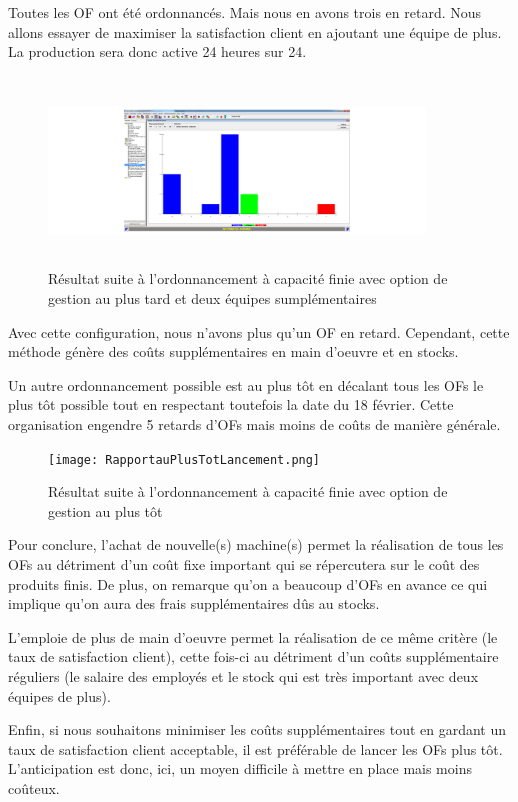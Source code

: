 \documentclass{scrreprt}
\begin{document}
Toutes les OF ont été ordonnancés. Mais nous en avons trois en retard. Nous allons essayer de maximiser la satisfaction client en ajoutant une équipe de plus. La production sera donc active 24 heures sur 24.

\begin{figure}[!h]
\centering
\includegraphics[width=10cm, height=5cm]{2equipeenplus.png}
\caption{Résultat suite à l'ordonnancement à capacité finie avec option de gestion au plus tard et deux équipes sumplémentaires}
\end{figure}

Avec cette configuration, nous n'avons plus qu'un OF en retard. Cependant, cette méthode génère des coûts supplémentaires en main d'oeuvre et en stocks.

Un autre ordonnancement possible est au plus tôt en décalant tous les OFs le plus tôt possible tout en respectant toutefois la date du 18 février. Cette organisation engendre 5 retards d'OFs mais moins de coûts de manière générale.

 \begin{figure}[!h]
\centering
\texttt{[image: RapportauPlusTotLancement.png]}
\caption{Résultat suite à l'ordonnancement à capacité finie avec option de gestion au plus tôt}
\end{figure}

Pour conclure, l'achat de nouvelle(s) machine(s) permet la réalisation de tous les OFs au détriment d'un coût fixe important qui se répercutera sur le coût des produits finis.
De plus, on remarque qu'on a beaucoup d'OFs en avance ce qui implique qu'on aura des frais supplémentaires dûs au stocks.

L'emploie de plus de main d'oeuvre permet la réalisation de ce même critère (le taux de satisfaction client), cette fois-ci au détriment d'un coûts supplémentaire 
réguliers (le salaire des employés et le stock qui est très important avec deux équipes de plus). 

Enfin, si nous souhaitons minimiser les coûts supplémentaires tout en gardant un taux de satisfaction client acceptable, 
il est préférable de lancer les OFs plus tôt. L'anticipation est donc, ici, un moyen difficile à mettre en place mais moins
coûteux. 
\end{document}

